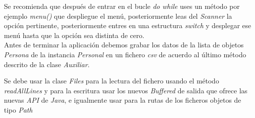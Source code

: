 \documentclass[4paper]{article}
\begin{document}
Se recomienda que después de entrar en el bucle \emph{do while} uses un método por ejemplo \emph{menu()} que despliegue el menú, posteriormente leas del \emph{Scanner} la opción pertinente, posteriormente entres en una estructura \emph{switch} y desplegar ese  menú hasta que la opción sea distinta de cero.\\
Antes de terminar la aplicación debemos grabar los datos de la lista de objetos \emph{Persona} de la instancia \emph{Personal} en un fichero \emph{csv} de acuerdo al último método descrito de la clase \emph{Auxiliar}.\par
\vspace{0.5cm}
Se debe usar la clase \emph{Files} para la lectura del fichero usando el método \emph{readAllLines} y para la escritura usar los nuevos \emph{Buffered} de salida que ofrece las nuevas \emph{API} de \emph{Java}, e igualmente usar para la rutas de los ficheros objetos de tipo \emph{Path}
\end{document}
